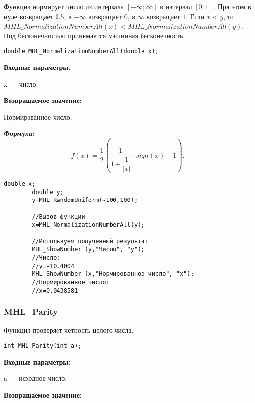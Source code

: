 \documentclass[a4paper,12pt]{article}
\begin{document}
Функция нормирует число из интервала $\left[-\infty;\infty \right] $ в интервал $\left[0;1\right]$. При этом в нуле возвращает $0.5$, в $-\infty$ возвращает $0$, в $\infty$ возвращает $1$. Если $x<y$, то $MHL\_NormalizationNumberAll(x)<MHL\_NormalizationNumberAll(y)$. Под бесконечностью принимается машинная бесконечность.


\begin{lstlisting}[label=code_syntax_MHL_NormalizationNumberAll,caption=Синтаксис]
double MHL_NormalizationNumberAll(double x);
\end{lstlisting}

\textbf{Входные параметры:}

 x --- число.

\textbf{Возвращаемое значение:}
 
Нормированное число.
 
\textbf{Формула:}
\begin{equation*}
f\left(x \right)=\frac{1}{2}\left( \dfrac{1}{1+\dfrac{1}{\left| x\right| }}\cdot sign \left( x\right)+1 \right) .
\end{equation*}


\begin{lstlisting}[label=code_use_MHL_NormalizationNumberAll,caption=Пример использования]
        double x;
        double y;
        y=MHL_RandomUniform(-100,100);

        //Вызов функции
        x=MHL_NormalizationNumberAll(y);

        //Используем полученный результат
        MHL_ShowNumber (y,"Число", "y");
        //Число:
        //y=-10.4004
        MHL_ShowNumber (x,"Нормированное число", "x");
        //Нормированное число:
        //x=0.0438581
\end{lstlisting}

\subsubsection{MHL\_Parity}\label{MHL_Parity}

Функция проверяет четность целого числа.


\begin{lstlisting}[label=code_syntax_MHL_Parity,caption=Синтаксис]
int MHL_Parity(int a);
\end{lstlisting}

\textbf{Входные параметры:}  
 
a --- исходное число.

\textbf{Возвращаемое значение:}
\end{document}
